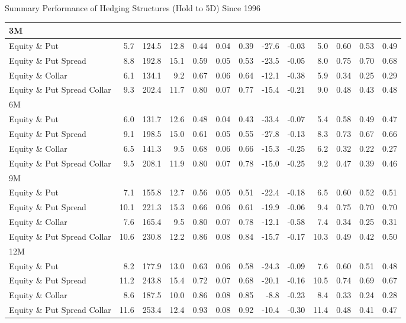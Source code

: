 \documentclass{beamer}
\begin{document}
\begin{frame}{\normalsize Summary Performance of Hedging Structures (Hold to 5D) Since 1996}
{\begin{tabular}{lrrrrrrrrrrrr}
\midrule
3M \\
\midrule
Equity \& Put & 5.7 & 124.5 & 12.8 & 0.44 & 0.04 & 0.39 & -27.6 & -0.03 & 5.0 & 0.60 & 0.53 & 0.49\\
Equity \& Put Spread & 8.8 & 192.8 & 15.1 & 0.59 & 0.05 & 0.53 & -23.5 & -0.05 & 8.0 & 0.75 & 0.70 & 0.68\\
Equity \& Collar & 6.1 & 134.1 & 9.2 & 0.67 & 0.06 & 0.64 & -12.1 & -0.38 & 5.9 & 0.34 & 0.25 & 0.29\\
Equity \& Put Spread Collar & 9.3 & 202.4 & 11.7 & 0.80 & 0.07 & 0.77 & -15.4 & -0.21 & 9.0 & 0.48 & 0.43 & 0.48\\
\midrule
6M \\
\midrule
Equity \& Put & 6.0 & 131.7 & 12.6 & 0.48 & 0.04 & 0.43 & -33.4 & -0.07 & 5.4 & 0.58 & 0.49 & 0.47\\
Equity \& Put Spread & 9.1 & 198.5 & 15.0 & 0.61 & 0.05 & 0.55 & -27.8 & -0.13 & 8.3 & 0.73 & 0.67 & 0.66\\
Equity \& Collar & 6.5 & 141.3 & 9.5 & 0.68 & 0.06 & 0.66 & -15.3 & -0.25 & 6.2 & 0.32 & 0.22 & 0.27\\
Equity \& Put Spread Collar & 9.5 & 208.1 & 11.9 & 0.80 & 0.07 & 0.78 & -15.0 & -0.25 & 9.2 & 0.47 & 0.39 & 0.46\\
\midrule
9M \\
\midrule
Equity \& Put & 7.1 & 155.8 & 12.7 & 0.56 & 0.05 & 0.51 & -22.4 & -0.18 & 6.5 & 0.60 & 0.52 & 0.51\\
Equity \& Put Spread & 10.1 & 221.3 & 15.3 & 0.66 & 0.06 & 0.61 & -19.9 & -0.06 & 9.4 & 0.75 & 0.70 & 0.70\\
Equity \& Collar & 7.6 & 165.4 & 9.5 & 0.80 & 0.07 & 0.78 & -12.1 & -0.58 & 7.4 & 0.34 & 0.25 & 0.31\\
Equity \& Put Spread Collar & 10.6 & 230.8 & 12.2 & 0.86 & 0.08 & 0.84 & -15.7 & -0.17 & 10.3 & 0.49 & 0.42 & 0.50\\
\midrule
12M \\
\midrule
Equity \& Put & 8.2 & 177.9 & 13.0 & 0.63 & 0.06 & 0.58 & -24.3 & -0.09 & 7.6 & 0.60 & 0.51 & 0.48\\
Equity \& Put Spread & 11.2 & 243.8 & 15.4 & 0.72 & 0.07 & 0.68 & -20.1 & -0.16 & 10.5 & 0.74 & 0.69 & 0.67\\
Equity \& Collar & 8.6 & 187.5 & 10.0 & 0.86 & 0.08 & 0.85 & -8.8 & -0.23 & 8.4 & 0.33 & 0.24 & 0.28\\
Equity \& Put Spread Collar & 11.6 & 253.4 & 12.4 & 0.93 & 0.08 & 0.92 & -10.4 & -0.30 & 11.4 & 0.48 & 0.41 & 0.47\\
\bottomrule
\end{tabular}
}
\end{frame}
\end{document}
